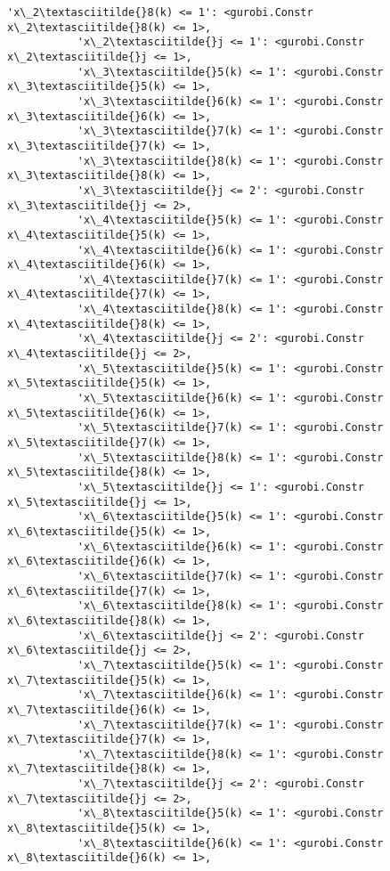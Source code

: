 \documentclass[11pt]{article}
\begin{document}
\begin{Verbatim}[commandchars=\\\{\}]
           'x\_2\textasciitilde{}8(k) <= 1': <gurobi.Constr x\_2\textasciitilde{}8(k) <= 1>,
           'x\_2\textasciitilde{}j <= 1': <gurobi.Constr x\_2\textasciitilde{}j <= 1>,
           'x\_3\textasciitilde{}5(k) <= 1': <gurobi.Constr x\_3\textasciitilde{}5(k) <= 1>,
           'x\_3\textasciitilde{}6(k) <= 1': <gurobi.Constr x\_3\textasciitilde{}6(k) <= 1>,
           'x\_3\textasciitilde{}7(k) <= 1': <gurobi.Constr x\_3\textasciitilde{}7(k) <= 1>,
           'x\_3\textasciitilde{}8(k) <= 1': <gurobi.Constr x\_3\textasciitilde{}8(k) <= 1>,
           'x\_3\textasciitilde{}j <= 2': <gurobi.Constr x\_3\textasciitilde{}j <= 2>,
           'x\_4\textasciitilde{}5(k) <= 1': <gurobi.Constr x\_4\textasciitilde{}5(k) <= 1>,
           'x\_4\textasciitilde{}6(k) <= 1': <gurobi.Constr x\_4\textasciitilde{}6(k) <= 1>,
           'x\_4\textasciitilde{}7(k) <= 1': <gurobi.Constr x\_4\textasciitilde{}7(k) <= 1>,
           'x\_4\textasciitilde{}8(k) <= 1': <gurobi.Constr x\_4\textasciitilde{}8(k) <= 1>,
           'x\_4\textasciitilde{}j <= 2': <gurobi.Constr x\_4\textasciitilde{}j <= 2>,
           'x\_5\textasciitilde{}5(k) <= 1': <gurobi.Constr x\_5\textasciitilde{}5(k) <= 1>,
           'x\_5\textasciitilde{}6(k) <= 1': <gurobi.Constr x\_5\textasciitilde{}6(k) <= 1>,
           'x\_5\textasciitilde{}7(k) <= 1': <gurobi.Constr x\_5\textasciitilde{}7(k) <= 1>,
           'x\_5\textasciitilde{}8(k) <= 1': <gurobi.Constr x\_5\textasciitilde{}8(k) <= 1>,
           'x\_5\textasciitilde{}j <= 1': <gurobi.Constr x\_5\textasciitilde{}j <= 1>,
           'x\_6\textasciitilde{}5(k) <= 1': <gurobi.Constr x\_6\textasciitilde{}5(k) <= 1>,
           'x\_6\textasciitilde{}6(k) <= 1': <gurobi.Constr x\_6\textasciitilde{}6(k) <= 1>,
           'x\_6\textasciitilde{}7(k) <= 1': <gurobi.Constr x\_6\textasciitilde{}7(k) <= 1>,
           'x\_6\textasciitilde{}8(k) <= 1': <gurobi.Constr x\_6\textasciitilde{}8(k) <= 1>,
           'x\_6\textasciitilde{}j <= 2': <gurobi.Constr x\_6\textasciitilde{}j <= 2>,
           'x\_7\textasciitilde{}5(k) <= 1': <gurobi.Constr x\_7\textasciitilde{}5(k) <= 1>,
           'x\_7\textasciitilde{}6(k) <= 1': <gurobi.Constr x\_7\textasciitilde{}6(k) <= 1>,
           'x\_7\textasciitilde{}7(k) <= 1': <gurobi.Constr x\_7\textasciitilde{}7(k) <= 1>,
           'x\_7\textasciitilde{}8(k) <= 1': <gurobi.Constr x\_7\textasciitilde{}8(k) <= 1>,
           'x\_7\textasciitilde{}j <= 2': <gurobi.Constr x\_7\textasciitilde{}j <= 2>,
           'x\_8\textasciitilde{}5(k) <= 1': <gurobi.Constr x\_8\textasciitilde{}5(k) <= 1>,
           'x\_8\textasciitilde{}6(k) <= 1': <gurobi.Constr x\_8\textasciitilde{}6(k) <= 1>,

\end{Verbatim}
\end{document}

